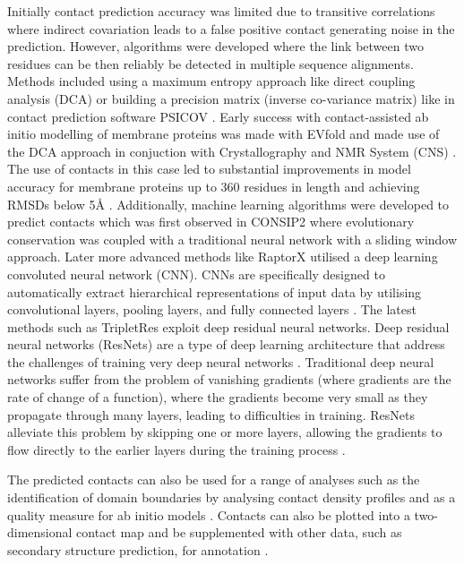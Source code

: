 Initially contact prediction accuracy was limited due to transitive correlations where indirect covariation leads to a false positive contact generating noise in the prediction.  However, algorithms were developed where the link between two residues can be then reliably be detected in multiple sequence alignments. Methods included using a maximum entropy approach like direct coupling analysis (DCA) \cite{Morcos2011} or building a precision matrix (inverse co-variance matrix) like in contact prediction software PSICOV \cite{jones2012psicov}.  Early success with contact-assisted ab initio modelling of membrane proteins was made with EVfold and made use of the DCA approach in conjuction with Crystallography and NMR System (CNS) \cite{brunger1998crystallography}.  The use of contacts in this case led to substantial improvements in model accuracy for membrane proteins up to 360 residues in length and achieving RMSDs below 5{\AA} \cite{Hopf2012}.
Additionally,  machine learning algorithms were developed to predict contacts \cite{Wu2020} which was first observed in CONSIP2 \cite{kosciolek2016accurate} where evolutionary conservation was coupled with a traditional neural network with a sliding window approach. Later more advanced methods like RaptorX \cite{wang2018analysis} utilised a deep learning convoluted neural network (CNN).  CNNs are specifically designed to automatically extract hierarchical representations of input data by utilising convolutional layers, pooling layers, and fully connected layers \cite{albawi2017understanding}.  The latest methods such as TripletRes \cite{li2021deducing} exploit deep residual neural networks. Deep residual neural networks (ResNets) are a type of deep learning architecture that address the challenges of training very deep neural networks \cite{li2016demystifying}. Traditional deep neural networks suffer from the problem of vanishing gradients (where gradients are the rate of change of a function), where the gradients become very small as they propagate through many layers, leading to difficulties in training. ResNets alleviate this problem by skipping one or more layers, allowing the gradients to flow directly to the earlier layers during the training process \cite{li2016demystifying}. 

The predicted contacts can also be used for a range of analyses such as the identification of domain boundaries by analysing contact density profiles \cite{Rigden2002,Simkovic2017} and as a quality measure for ab initio models \cite{DeOliveira2016}.  Contacts can also be plotted into a two-dimensional contact map \cite{Simkovic2017} and be supplemented with other data, such as secondary structure prediction, for annotation \cite{sanchez2021conplot}.

